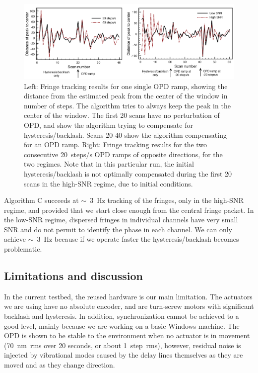 \begin{figure}[ht!]
\begin{center}
\includegraphics[width=1\textwidth]{Figures/ramps.png}
\caption{Left: Fringe tracking results for one single OPD ramp, showing the distance from the estimated peak from the center of the window in number of steps. The algorithm tries to always keep the peak in the center of the window. The first 20 scans have no perturbation of OPD, and show the algorithm trying to compensate for hysteresis/backlash. Scans 20-40 show the algorithm compensating for an OPD ramp. Right: Fringe tracking results for the two consecutive 20~steps/s OPD ramps of opposite directions, for the two regimes. Note that in this particular run, the initial hysteresis/backlash is not optimally compensated during the first 20 scans in the high-SNR regime, due to initial conditions.}
\label{fig:ramps}
\end{center}
\end{figure}

Algorithm C succeeds at $\sim$~3~Hz tracking of the fringes, only in the high-SNR regime, and provided that we start close enough from the central fringe packet. In the low-SNR regime, dispersed fringes in individual channels have very small SNR and do not permit to identify the phase in each channel. We can only achieve $\sim$~3~Hz because if we operate faster the hysteresis/backlash becomes problematic.



\subsection{Limitations and discussion}
In the current testbed, the reused hardware is our main limitation. The actuators we are using have no absolute encoder, and are turn-screw motors with significant backlash and hysteresis. In addition, synchronization cannot be achieved to a good level, mainly because we are working on a basic Windows machine. The OPD is shown to be stable to the environment when no actuator is in movement (70~nm~rms over 20 seconds, or about 1~step~rms), however, residual noise is injected by vibrational modes caused by the delay lines themselves as they are moved and as they change direction.

